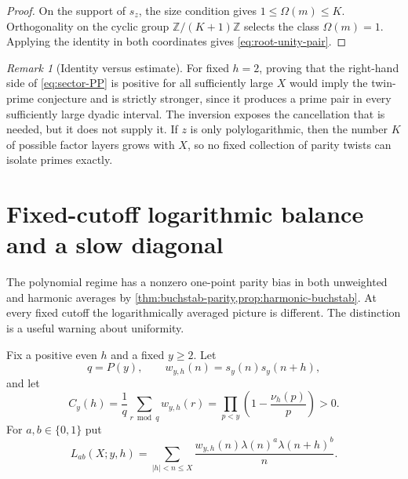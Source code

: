 \documentclass[11pt]{article}
\theoremstyle{definition}
\theoremstyle{remark}
\newtheorem{remark}[theorem]{Remark}
\newcommand{\Z}{\mathbb Z}
\newcommand{\Om}{\Omega}
\begin{document}
\begin{proof}
On the support of $s_z$, the size condition gives $1\le\Om(m)\le K$.  Orthogonality on the cyclic group $\Z/(K+1)\Z$ selects the class $\Om(m)=1$.  Applying the identity in both coordinates gives \eqref{eq:root-unity-pair}.
\end{proof}

\begin{remark}[Identity versus estimate]\label{rem:identity-versus-estimate}
For fixed $h=2$, proving that the right-hand side of \eqref{eq:sector-PP} is positive for all sufficiently large $X$ would imply the twin-prime conjecture and is strictly stronger, since it produces a prime pair in every sufficiently large dyadic interval.  The inversion exposes the cancellation that is needed, but it does not supply it.  If $z$ is only polylogarithmic, then the number $K$ of possible factor layers grows with $X$, so no fixed collection of parity twists can isolate primes exactly.
\end{remark}

\section{Fixed-cutoff logarithmic balance and a slow diagonal}\label{sec:log-balance}

The polynomial regime has a nonzero one-point parity bias in both unweighted and harmonic averages by \cref{thm:buchstab-parity,prop:harmonic-buchstab}.  At every fixed cutoff the logarithmically averaged picture is different.  The distinction is a useful warning about uniformity.

Fix a positive even $h$ and a fixed $y\ge2$.  Let
\begin{equation}\label{eq:fixed-mask}
 q=P(y),\qquad
 w_{y,h}(n)=s_y(n)s_y(n+h),
\end{equation}
and let
\begin{equation}\label{eq:fixed-mask-density}
 C_y(h)=\frac1q\sum_{r\bmod q}w_{y,h}(r)
 =\prod_{p<y}\left(1-\frac{\nu_h(p)}p\right)>0.
\end{equation}
For $a,b\in\{0,1\}$ put
\begin{equation}\label{eq:log-moments}
 L_{ab}(X;y,h)=
 \sum_{|h|<n\le X}
 \frac{w_{y,h}(n)\lambda(n)^a\lambda(n+h)^b}{n}.
\end{equation}
\end{document}
